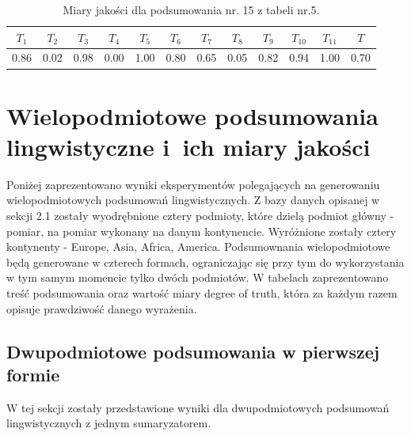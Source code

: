 \documentclass{article}
\begin{document}
\begin{table}[H]
    \centering
    \begin{tabular}{|c|c|c|c|c|c|c|c|c|c|c|c|}
    \hline
    \textbf{\(T_1\)} &\textbf{\(T_2\)} & \textbf{\(T_3\)} & \textbf{\(T_4\)} & \textbf{\(T_5\)} & \textbf{\(T_6\)} & \textbf{\(T_7\)} & \textbf{\(T_8\)} & \textbf{\(T_9\)} & \textbf{\(T_{10}\)} & \textbf{\(T_{11}\)} & \textbf{\(T\)} \\ \hline
    0.86 & 0.02 & 0.98 & 0.00 & 1.00 & 0.80 & 0.65 & 0.05 & 0.82 & 0.94 & 1.00 & 0.70 \\ \hline
    \end{tabular}
    \caption{Miary jakości dla podsumowania nr. 15 z tabeli nr.5.}
\end{table}  


\section{Wielopodmiotowe podsumowania lingwistyczne i~ich miary jakości} 
Poniżej zaprezentowano wyniki eksperymentów polegających na generowaniu wielopodmiotowych podsumowań lingwistycznych. Z bazy danych opisanej w sekcji 2.1 zostały wyodrębnione cztery podmioty, które dzielą podmiot główny - pomiar, na pomiar wykonany na danym kontynencie. Wyróżnione zostały cztery kontynenty - Europe, Asia, Africa, America. Podsumownania wielopodmiotowe będą generowane w czterech formach, ograniczając się przy tym do wykorzystania w tym samym momencie tylko dwóch podmiotów. W tabelach zaprezentowano treść podsumowania oraz wartość miary degree of truth, która za każdym razem opisuje prawdziwość danego wyrażenia.

\subsection{Dwupodmiotowe podsumowania w pierwszej formie}
W tej sekcji zostały przedstawione wyniki dla dwupodmiotowych podsumowań lingwistycznych z jednym sumaryzatorem.
\end{document}
